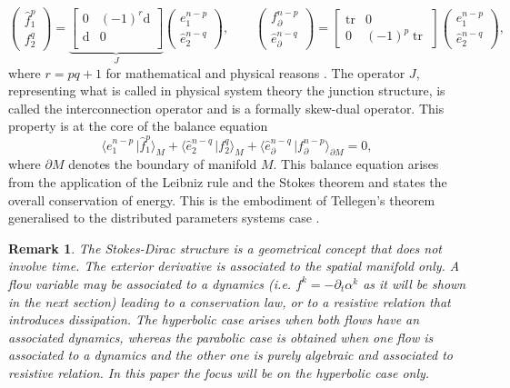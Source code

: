 \documentclass{elsarticle}
\newcommand{\revTwo}[1]{{\color{black}#1}}
\newtheorem{remark}{Remark}
\renewcommand\d{\ensuremath{\mathrm{d}}}
\DeclareMathOperator{\tr}{tr}
\newcommand*{\dual}[1]{\ensuremath{\widehat{#1}}}
\newcommand{\dualpr}[3][]{\ensuremath{\langle #2 \, \vert #3 \rangle_{#1}}}
\begin{document}
\begin{equation}\label{eq:StokesDirac}
    \begin{pmatrix}
        \dual{f}^p_1 \\
        {f}^q_2
    \end{pmatrix} = 
    \underbrace{\begin{bmatrix}
    0 & (-1)^r \d \\
    \d & 0 \\
    \end{bmatrix}}_{J}
    \begin{pmatrix}
        {e}^{n-p}_1 \\
        \dual{e}^{n-q}_2
    \end{pmatrix}, \qquad 
    \begin{pmatrix}
        {f}_\partial^{n-p} \\
        \dual{e}_\partial^{n-q}
    \end{pmatrix} = 
    \begin{bmatrix}
    \tr & 0 \\
    0 &  (-1)^p\tr
    \end{bmatrix}
    \begin{pmatrix}
        {e}^{n-p}_1 \\
        \dual{e}^{n-q}_2
    \end{pmatrix},
\end{equation}
where $r = pq +1$ for mathematical and physical reasons \cite{vanderSchaft2002}. The operator $J$, representing what is called in physical system theory the junction structure, is called the interconnection operator and is a formally \revTwo{skew-dual} operator. This property is at the core of the balance equation
\begin{equation}\label{eq:bal_eq}
    \dualpr[M]{e^{n-p}_1}{\dual{f}^p_1} + \dualpr[M]{\dual{e}^{n-q}_2}{f^q_2} + \dualpr[\partial M]{\dual{e}_\partial^{n-q}}{{f}_\partial^{n-p}} = 0,
\end{equation}
where $\partial M$ denotes the boundary of manifold $M$. This balance equation arises from the application of the Leibniz rule and the Stokes theorem and states the overall conservation of energy.
This is the  embodiment of Tellegen's theorem generalised to the  distributed parameters systems case \cite{iftime2014kernel}. 
\revTwo{\begin{remark}
The Stokes-Dirac structure is a geometrical concept that does not involve time. The exterior derivative is associated to the spatial manifold only. A flow variable may be associated to a dynamics (i.e. $f^k = -\partial_t \alpha^k$ as it will be shown in the next section) leading to a conservation law, or to a resistive relation that introduces dissipation. The hyperbolic case arises when both flows have an associated dynamics, whereas the parabolic case is obtained when one flow is associated to a dynamics and the other one is purely algebraic and associated to resistive relation. In this paper the focus will be on the hyperbolic case only.
\end{remark}
} 
\end{document}
